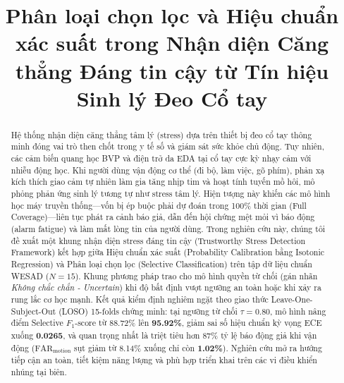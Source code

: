 \documentclass[conference]{IEEEtran}
\begin{document}
\title{Phân loại chọn lọc và Hiệu chuẩn xác suất trong Nhận diện Căng thẳng Đáng tin cậy từ Tín hiệu Sinh lý Đeo Cổ tay}

\author{
}

\maketitle

\begin{abstract}
Hệ thống nhận diện căng thẳng tâm lý (stress) dựa trên thiết bị đeo cổ tay thông minh đóng vai trò then chốt trong y tế số và giám sát sức khỏe chủ động. Tuy nhiên, các cảm biến quang học BVP và điện trở da EDA tại cổ tay cực kỳ nhạy cảm với nhiễu động học. Khi người dùng vận động cơ thể (đi bộ, làm việc, gõ phím), phản xạ kích thích giao cảm tự nhiên làm gia tăng nhịp tim và hoạt tính tuyến mồ hôi, mô phỏng phản ứng sinh lý tương tự như stress tâm lý. Hiện tượng này khiến các mô hình học máy truyền thống---vốn bị ép buộc phải dự đoán trong 100\% thời gian (Full Coverage)---liên tục phát ra cảnh báo giả, dẫn đến hội chứng mệt mỏi vì báo động (alarm fatigue) và làm mất lòng tin của người dùng. Trong nghiên cứu này, chúng tôi đề xuất một khung nhận diện stress đáng tin cậy (Trustworthy Stress Detection Framework) kết hợp giữa Hiệu chuẩn xác suất (Probability Calibration bằng Isotonic Regression) và Phân loại chọn lọc (Selective Classification) trên tập dữ liệu chuẩn WESAD ($N=15$). Khung phương pháp trao cho mô hình quyền từ chối (gán nhãn \textit{Không chắc chắn - Uncertain}) khi độ bất định vượt ngưỡng an toàn hoặc khi xảy ra rung lắc cơ học mạnh. Kết quả kiểm định nghiêm ngặt theo giao thức Leave-One-Subject-Out (LOSO) 15-folds chứng minh: tại ngưỡng từ chối $\tau = 0.80$, mô hình nâng điểm Selective $F_1$-score từ 88.72\% lên \textbf{95.92\%}, giảm sai số hiệu chuẩn kỳ vọng ECE xuống \textbf{0.0265}, và quan trọng nhất là triệt tiêu hơn 87\% tỷ lệ báo động giả khi vận động ($\text{FAR}_{\text{motion}}$ sụt giảm từ 8.14\% xuống chỉ còn \textbf{1.02\%}). Nghiên cứu mở ra hướng tiếp cận an toàn, tiết kiệm năng lượng và phù hợp triển khai trên các vi điều khiển nhúng tại biên.
\end{abstract}
\end{document}
